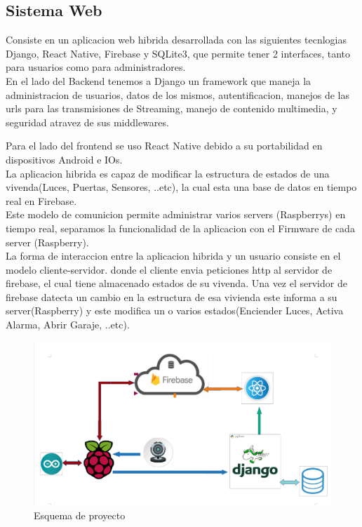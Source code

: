 \documentclass[letterpaper,12pt]{article}
\begin{document}
{\subsection{Sistema Web}

Consiste en un aplicacion web hibrida  desarrollada con las siguientes tecnlogias Django, React Native, Firebase y SQLite3,  que permite tener 2 interfaces, tanto para usuarios como para administradores.\\

En el lado del Backend tenemos a Django un framework que maneja la administracion de usuarios, datos de los mismos, autentificacion, manejos de las urls para las transmisiones de Streaming, manejo de contenido multimedia, y seguridad atravez de sus middlewares.

Para el lado del frontend se uso React Native debido a su portabilidad en dispositivos Android e IOs.\\

La aplicacion hibrida es capaz de modificar la estructura de estados de una vivenda(Luces, Puertas, Sensores, ..etc), la cual esta una base de datos en tiempo real  en Firebase.\\

Este modelo de comunicion permite administrar varios servers (Raspberrys) en tiempo real,  separamos la funcionalidad de la aplicacion con el Firmware de cada server (Raspberry).\\

La forma de interaccion  entre la aplicacion hibrida y un usuario consiste en el modelo  cliente-servidor. donde el cliente  envia peticiones http al servidor de firebase, el cual tiene almacenado estados de su vivenda. Una vez el servidor de firebase datecta un cambio en la estructura de esa vivienda  este informa a su server(Raspberry) y este modifica un o varios estados(Enciender Luces, Activa Alarma, Abrir Garaje, ..etc).


\begin{figure}[h]
	
	\begin{minipage}[t]{17cm}
		\includegraphics[width=15cm]{images/esquema1.png}	 %
		\caption{ Esquema de proyecto }
	\end{minipage}
	

\end{figure}}
\end{document}
